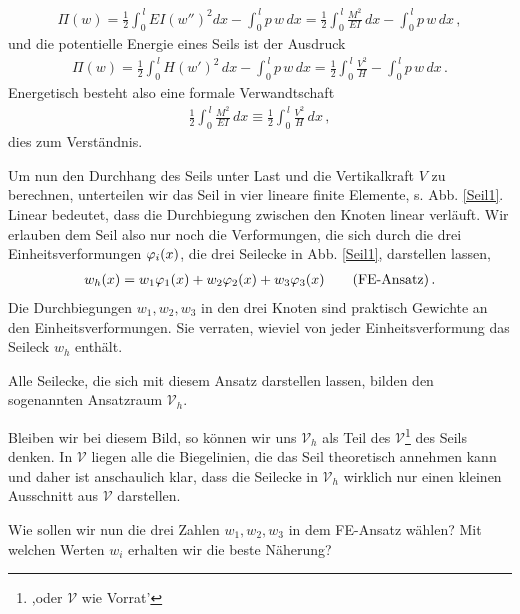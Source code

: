 \begin{align}
\Pi(w) = \frac{1}{2} \int_0^{\,l} EI (w'')^2 dx - \int_0^{\,l} p \, w\, dx = \frac{1}{2}
\int_0^{\,l} \frac{M^2}{EI} \,dx - \int_0^{\,l} p \, w\, dx\,,
\end{align}
und die potentielle Energie eines Seils ist der Ausdruck
\begin{align}
\Pi(w) = \frac{1}{2} \int_0^{\,l} H (w')^2 \,dx - \int_0^{\,l} p \, w\, dx = \frac{1}{2}
\int_0^{\,l}\frac{V^2}{H}- \int_0^{\,l} p \, w\, dx\,.
\end{align}
Energetisch besteht also eine formale Verwandtschaft
\begin{align}
\frac{1}{2} \int_0^{\,l} \frac{M^2}{EI} \,dx \equiv \frac{1}{2} \int_0^{\,l}
\frac{V^2}{H}\,dx\,,
\end{align}
dies zum Verst\"{a}ndnis.

Um nun den Durchhang des Seils unter Last und die Vertikalkraft $V$ zu berechnen, unterteilen wir das Seil in vier lineare finite Elemente, s. Abb. \ref{Seil1}. Linear bedeutet, dass die Durchbiegung zwischen den Knoten linear verl\"{a}uft. Wir erlauben dem Seil also nur noch die Verformungen, die sich durch die drei Einheitsverformungen $\varphi_i(x)$, die drei Seilecke in Abb. \ref{Seil1}, darstellen lassen,
\begin{align}
 w_{h}(x) = w_1 \varphi_1(x) + w_2 \varphi_2(x) + w_3 \varphi_3(x) \qquad
\mbox{(FE-Ansatz)} \,.
\end{align}
Die Durchbiegungen $w_1, w_2, w_3$ in den drei Knoten sind praktisch Gewichte an den Einheitsverformungen. Sie verraten, wieviel von jeder Einheitsverformung das Seileck $w_{h}$ enth\"{a}lt.

Alle Seilecke, die sich mit diesem Ansatz darstellen lassen,  bilden den sogenannten Ansatzraum $\mathcal{V}_{h}$.

Bleiben wir bei diesem Bild, so k\"{o}nnen wir uns $\mathcal{V}_h$ als Teil des  $\mathcal{V}$\footnote{,oder $\mathcal{V}$ wie Vorrat'} des Seils denken. In $\mathcal{V}$ liegen alle die Biegelinien, die das Seil theoretisch annehmen kann und daher ist anschaulich klar, dass die Seilecke in $\mathcal{V}_h$ wirklich nur einen kleinen Ausschnitt aus $\mathcal{V}$ darstellen.

Wie sollen wir nun die drei  Zahlen $w_1, w_2,w_3$ in dem FE-Ansatz w\"{a}hlen? Mit welchen Werten $w_i$ erhalten wir die beste N\"{a}herung?

